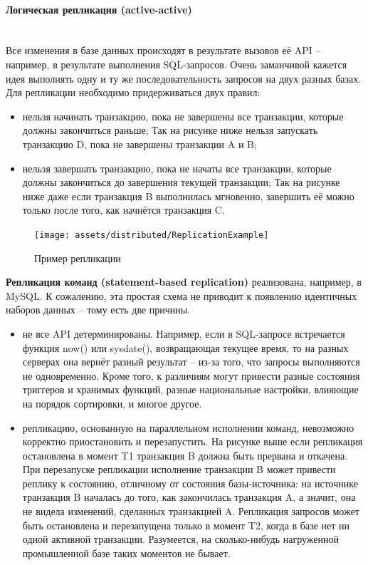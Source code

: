 \paragraph{Логическая репликация (active-active)} ~\\
Все изменения в базе данных происходят в результате вызовов её API – например, в результате выполнения SQL-запросов.
Очень заманчивой кажется идея выполнять одну и ту же последовательность запросов на двух разных базах. Для репликации
необходимо придерживаться двух правил:
\begin{itemize}
    \item нельзя начинать транзакцию, пока не завершены все транзакции, которые должны закончиться раньше; Так на рисунке ниже нельзя запускать транзакцию D, пока не завершены транзакции A и B;
    \item нельзя завершать транзакцию, пока не начаты все транзакции, которые должны закончиться до завершения текущей транзакции; Так на рисунке ниже даже если транзакция B выполнилась мгновенно, завершить её можно только после того, как начнётся транзакция C.
\end{itemize}

\begin{figure}[H]
    \centering
    \texttt{[image: assets/distributed/ReplicationExample]}
    \caption{Пример репликации}
    \label{fig:ReplicationExample}
\end{figure}

\textbf{Репликация команд (statement-based replication)} реализована, например, в MySQL. К сожалению, эта простая схема не
приводит к появлению идентичных наборов данных – тому есть две причины.
\begin{itemize}
    \item не все API детерминированы. Например, если в SQL-запросе встречается функция now() или sysdate(), возвращающая текущее время, то на разных серверах она вернёт разный результат – из-за того, что запросы выполняются не одновременно. Кроме того, к различиям могут привести разные состояния триггеров и хранимых функций, разные национальные настройки, влияющие на порядок сортировки, и многое другое.
    \item репликацию, основанную на параллельном исполнении команд, невозможно корректно приостановить и перезапустить. На рисунке выше если репликация остановлена в момент T1 транзакция B должна быть прервана и откачена. При перезапуске репликации исполнение транзакции B может привести реплику к состоянию, отличному от состояния базы-источника: на источнике транзакция B началась до того, как закончилась транзакция A, а значит, она не видела изменений, сделанных транзакцией A. Репликация запросов может быть остановлена и перезапущена только в момент T2, когда в базе нет ни одной активной транзакции. Разумеется, на сколько-нибудь нагруженной промышленной базе таких моментов не бывает.
\end{itemize}


